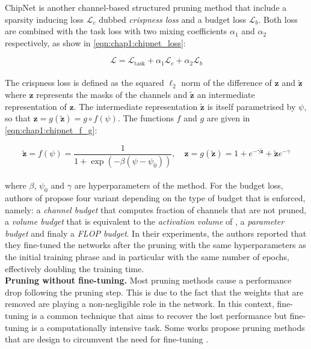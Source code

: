 ChipNet \cite{tiwari2021chipnet} is another channel-based structured pruning
method that include a sparsity inducing loss $\mathcal{L}_c$ dubbed
\emph{crispness loss} and a budget loss $\mathcal{L}_b$. Both loss are combined
with the task loss with two mixing coefficients $\alpha_1$ and $\alpha_2$
respectively, as show in \cref{eqn:chap1:chipnet_loss}:

\begin{equation}
  \label{eqn:chap1:chipnet_loss}
  \mathcal{L} = \mathcal{L}_{\text{task}} + \alpha_1 \mathcal{L}_c + \alpha_2 \mathcal{L}_b
\end{equation}\\

The crispness loss is defined as the squared $\ell_2$ norm of the difference of
$\mathbf{z}$ and $\tilde{\mathbf{z}}$ where $\mathbf{z}$ represents the masks of
the channels and $\tilde{\mathbf{z}}$ an intermediate representation of
$\mathbf{z}$. The intermediate representation $\tilde{\mathbf{z}}$ is itself
parametrised by $\psi$, so that $\mathbf{z}=g(\tilde{\mathbf{z}})=g \circ
f(\psi)$. The functions $f$ and $g$ are given in \cref{eqn:chap1:chipnet_f_g}:

\begin{equation}
  \label{eqn:chap1:chipnet_f_g}
  \tilde{\mathbf{z}} = f(\psi) = \frac{1}{1 + \exp(-\beta(\psi-\psi_0))}, \quad \mathbf{z} = g(\tilde{\mathbf{z}}) = 1 + e^{-\gamma\tilde{\mathbf{z}}} + \tilde{\mathbf{z}}e^{-\gamma}
\end{equation}\\

\noindent where $\beta$, $\psi_0$ and $\gamma$ are hyperparameters of the
method. For the budget loss, authors of \cite{tiwari2021chipnet} propose four
variant depending on the type of budget that is enforced, namely: a
\emph{channel budget} that computes fraction of channels that are not pruned, a
\emph{volume budget} that is equivalent to the \emph{activation volume} of
\cite{lemaire2019structured}, a \emph{parameter budget} and finaly a
\emph{\ac{FLOP} budget}. In their experiments, the authors reported that they
fine-tuned the networks after the pruning with the same hyperparameters as the
initial training phrase and in particular with the same number of epochs,
effectively doubling the training time.\\

\noindent\textbf{Pruning without fine-tuning.} Most pruning methods cause a
performance drop following the pruning step. This is due to the fact that the
weights that are removed are playing a non-negligible role in the network. In
this context, fine-tuning is a common technique that aims to recover the lost
performance but fine-tuning is a computationally intensive task. Some works
propose pruning methods that are design to circumvent the need for fine-tuning
\cite{DBLP:conf/nips/HassibiS92,DBLP:conf/icnn/HassibiSW93,DBLP:conf/icml/KangH20}.\\


